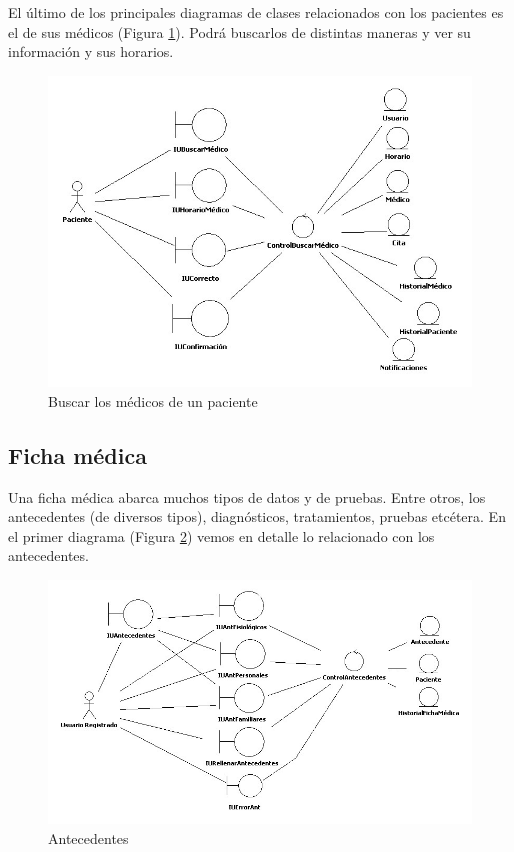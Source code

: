 \newpage
El último de los principales diagramas de clases relacionados con los pacientes es el de sus médicos (Figura \ref{fig:col_clase12}). Podrá buscarlos de distintas maneras y ver su información y sus horarios.
\begin{figure}[H]
  \centering
    \includegraphics[width=16cm]{img/jpg/clases/11_PacientesMedicos.jpg}
  \caption{Buscar los médicos de un paciente}
  \label{fig:col_clase12}
\end{figure}

\newpage
\subsection{Ficha médica} %
\label{sub:ficha_medica}

	Una ficha médica abarca muchos tipos de datos y de pruebas. Entre otros, los antecedentes (de diversos tipos), diagnósticos, tratamientos, pruebas etcétera. En el primer diagrama (Figura \ref{fig:col_clase13}) vemos en detalle lo relacionado con los antecedentes.
	\begin{figure}[H]
	  \centering
	    \includegraphics[width=16cm]{img/jpg/clases/12_Antecedentes.jpg}
	  \caption{Antecedentes}
	  \label{fig:col_clase13}
	\end{figure}

